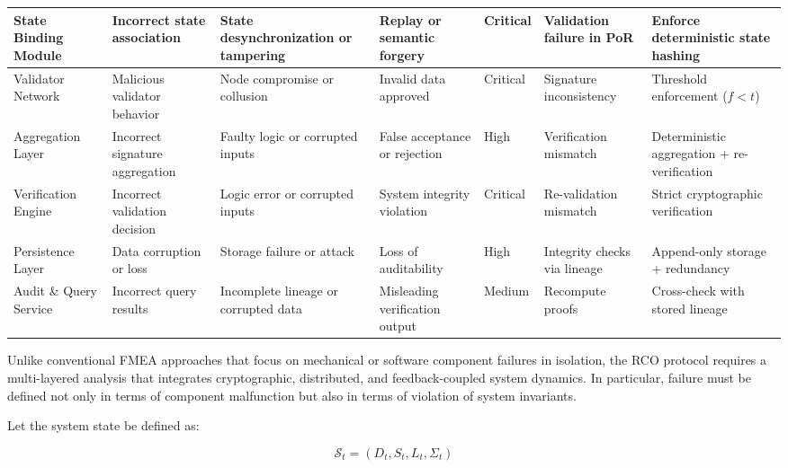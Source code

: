 \begin{table}[htbp]
\begin{tabularx}{\textwidth}{|p{2.8cm}|X|X|X|p{2cm}|p{2cm}|p{2cm}|}
\hline

State Binding Module & Incorrect state association & State desynchronization or tampering & Replay or semantic forgery & Critical & Validation failure in PoR & Enforce deterministic state hashing \\

\hline

Validator Network & Malicious validator behavior & Node compromise or collusion & Invalid data approved & Critical & Signature inconsistency & Threshold enforcement ($f < t$) \\

\hline

Aggregation Layer & Incorrect signature aggregation & Faulty logic or corrupted inputs & False acceptance or rejection & High & Verification mismatch & Deterministic aggregation + re-verification \\

\hline

Verification Engine & Incorrect validation decision & Logic error or corrupted inputs & System integrity violation & Critical & Re-validation mismatch & Strict cryptographic verification \\

\hline

Persistence Layer & Data corruption or loss & Storage failure or attack & Loss of auditability & High & Integrity checks via lineage & Append-only storage + redundancy \\

\hline

Audit \& Query Service & Incorrect query results & Incomplete lineage or corrupted data & Misleading verification output & Medium & Recompute proofs & Cross-check with stored lineage \\

\hline

\end{tabularx}
\end{table}

Unlike conventional FMEA approaches that focus on mechanical or software component failures in isolation, the RCO protocol requires a multi-layered analysis that integrates cryptographic, distributed, and feedback-coupled system dynamics. In particular, failure must be defined not only in terms of component malfunction but also in terms of violation of system invariants.

Let the system state be defined as:

\begin{equation}
\mathcal{S}_t = (D_t, S_t, L_t, \Sigma_t)
\end{equation}

